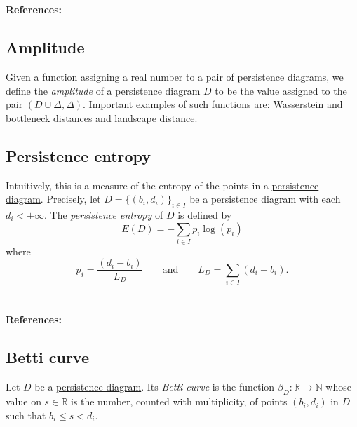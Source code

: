 \documentclass{amsart}
\begin{document}
	\paragraph{\\ References:} \cite{chazal2014stochastic}
	
	\subsection*{Amplitude} \label{amplitude}
	
	Given a function assigning a real number to a pair of persistence diagrams, we define the \textit{amplitude} of a persistence diagram $D$ to be the value assigned to the pair $(D \cup \Delta, \Delta)$. Important examples of such functions are: \hyperref[wasserstein and bottleneck distance]{Wasserstein and bottleneck distances} and \hyperref[persistence landscape norm]{landscape distance}.
	
	\subsection*{Persistence entropy} \label{persistence entropy}
	
	Intuitively, this is a measure of the entropy of the points in a \hyperref[persistence diagram]{persistence diagram}. Precisely, let $D = \{(b_i, d_i)\}_{i \in I}$ be a persistence diagram with each $d_i < +\infty$. The \textit{persistence entropy} of $D$ is defined by
	\begin{equation*}
	E(D) = - \sum_{i \in I} p_i \log(p_i)
	\end{equation*}
	where
	\begin{equation*}
	p_i = \frac{(d_i - b_i)}{L_D} \qquad \text{and} \qquad L_D = \sum_{i \in I} (d_i - b_i) . 
	\end{equation*}
	
	\paragraph{\\ References:} \cite{rucco2016characterisation}
	
	\subsection*{Betti curve} \label{betti curve}
	
	Let $D$ be a \hyperref[persistence diagram]{persistence diagram}. Its \textit{Betti curve} is the function $\beta_D : \mathbb R \to \mathbb N$ whose value on $s \in \mathbb R$ is the number, counted with multiplicity, of points $(b_i,d_i)$ in $D$ such that $b_i \leq s <d_i$.
	
\end{document}
